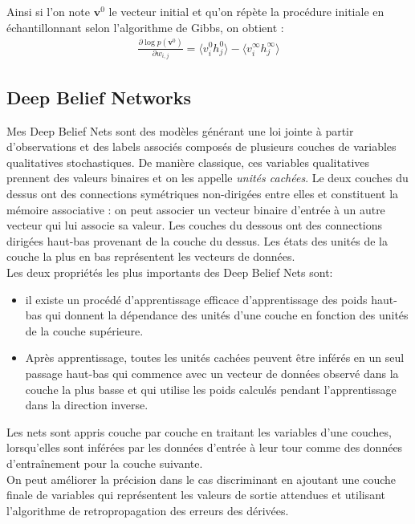 \documentclass{article}
\theoremstyle{definition}
\begin{document}
\noindent Ainsi si l'on note $\textbf{v}^0$ le vecteur initial et qu'on répète la procédure initiale en échantillonnant selon l'algorithme de Gibbs, on obtient :
\begin{align*}
\frac{\partial \log p(\textbf{v}^0)}{\partial w_{i,j}}=\langle v_i^0 h_j^0\rangle-\langle v_i^{\infty} h_j^{\infty}\rangle
\end{align*}

\subsection{Deep Belief Networks}

\noindent Mes Deep Belief Nets sont des modèles générant une loi jointe à partir d'observations et des labels associés composés de plusieurs couches de variables qualitatives stochastiques. De manière classique, ces variables qualitatives prennent des valeurs binaires et on les appelle \textit{unités cachées}. Le deux couches du dessus ont des connections symétriques non-dirigées entre elles et constituent la mémoire associative : on peut associer un vecteur binaire d'entrée à un autre vecteur qui lui associe sa valeur. Les couches du dessous ont des connections dirigées haut-bas provenant de la couche du dessus. Les états des unités de la couche la plus en bas représentent les vecteurs de données.\\

\noindent Les deux propriétés les plus importants des Deep Belief Nets sont:
\begin{itemize}
\item il existe un procédé d'apprentissage efficace d'apprentissage des poids haut-bas qui donnent la dépendance des unités d'une couche en fonction des unités de la couche supérieure.
\item Après apprentissage, toutes les unités cachées peuvent être inférés en un seul passage haut-bas qui commence avec un vecteur de données observé dans la couche la plus basse et qui utilise les poids calculés pendant l'apprentissage dans la direction inverse.\\
\end{itemize}

\noindent Les nets sont appris couche par couche en traitant les variables d'une couches, lorsqu'elles sont inférées par les données d'entrée à leur tour comme des données d'entraînement pour la couche suivante.\\

\noindent On peut améliorer la précision dans le cas discriminant en ajoutant une couche finale de variables qui représentent les valeurs de sortie attendues et utilisant l'algorithme de retropropagation des erreurs des dérivées.\\
\end{document}
